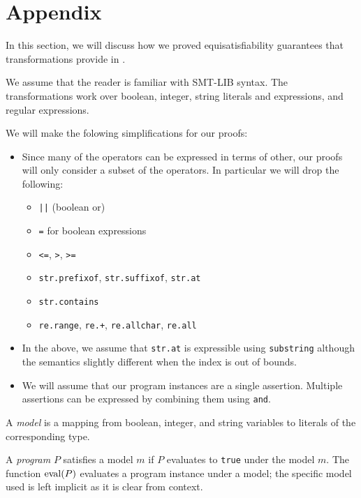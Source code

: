 \section{Appendix}

In this section, we will discuss how we proved equisatisfiability guarantees
that transformations provide in \fuzzer{}.

We assume that the reader is familiar with SMT-LIB syntax. The transformations
work over boolean, integer, string literals and expressions, and regular
expressions.

We will make the folowing simplifications for our proofs:
\begin{itemize}
  \item
    Since many of the operators can be expressed in terms of other, our
    proofs will only consider a subset of the operators. In particular we will
    drop the following:
    \begin{itemize}
      \item \texttt{||} (boolean or)
      \item \texttt{=} for boolean expressions
      \item \texttt{<=}, \texttt{>}, \texttt{>=}
      \item \texttt{str.prefixof}, \texttt{str.suffixof}, \texttt{str.at}
      \item \texttt{str.contains}
      \item \texttt{re.range}, \texttt{re.+}, \texttt{re.allchar}, \texttt{re.all}
    \end{itemize}

  \item
    In the above, we assume that \texttt{str.at} is expressible using
    \texttt{substring} although the semantics slightly different when the index
    is out of bounds.

  \item
    We will assume that our program instances are a single assertion. Multiple
    assertions can be expressed by combining them using \texttt{and}.
\end{itemize}

\begin{definition}
  A \emph{model} is a mapping from boolean, integer, and string variables to
literals of the corresponding type.
\end{definition}

\begin{definition}
  A \emph{program} $P$ satisfies a model $m$ if $P$ evaluates to \texttt{true}
under the model $m$. The function $\operatorname{eval} (P)$ evaluates a program instance
under a model; the specific model used is left implicit as it is clear from
context.
\end{definition}

